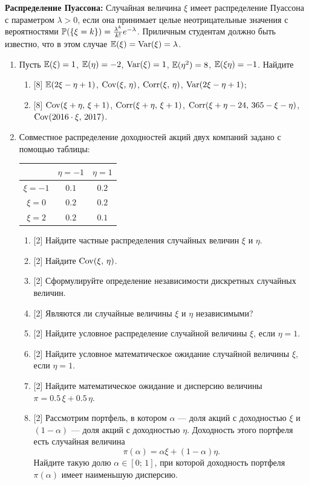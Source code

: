 \documentclass[12pt, a4paper]{article}\usepackage[]{graphicx}\usepackage[]{color}
\begin{document}
\textbf{Распределение Пуассона:} Случайная величина $\xi$ имеет распределение Пуассона с параметром $\lambda > 0$,  если она принимает целые неотрицательные значения с вероятностями $\P(\{\xi = k\}) = \frac{\lambda^k}{k!}e^{-\lambda}$. Приличным студентам должно быть известно, что в этом случае $\E(\xi) = \Var(\xi) = \lambda$.

\begin{enumerate}
\item Пусть $\E(\xi) = 1$, $\E(\eta) = -2$, $\Var(\xi) = 1$, $\E(\eta^2) = 8$, $\E(\xi \eta) = -1$. Найдите
\begin{enumerate}
  \item{} [8] $\E(2\xi-\eta+1)$, $\Cov(\xi, \,\eta)$, $\Corr(\xi, \,\eta)$,  $\Var(2\xi-\eta+1)$;
  \item{} [8] $\Cov(\xi+\eta, \,\xi+1)$, $\Corr(\xi+\eta, \,\xi+1)$, $\Corr(\xi+\eta-24, \,365 - \xi - \eta)$, $\Cov(2016\cdot\xi, \, 2017)$.
\end{enumerate}

\item
Совместное распределение доходностей акций двух компаний задано с помощью таблицы:

\begin{center}
\begin{tabular}{c|cc}
\toprule
         & $\eta=-1$ & $\eta=1$ \\
\midrule
$\xi=-1$  & $0.1$       & $0.2$   \\
$\xi=0$   & $0.2$       & $0.2$   \\
$\xi=2$   & $0.2$       & $0.1$   \\
\bottomrule
\end{tabular}
\end{center}

\begin{enumerate}
  \item{} [2] Найдите частные распределения случайных величин $\xi$ и $\eta$.
  \item{} [2] Найдите $\Cov(\xi,\,\eta)$.
  \item{} [2] Сформулируйте определение независимости дискретных случайных величин.
  \item{} [2] Являются ли случайные величины $\xi$ и $\eta$ независимыми?
  \item{} [2] Найдите условное распределение случайной величины $\xi$, если $\eta = 1$.
  \item{} [2] Найдите условное математическое ожидание случайной величины $\xi$, если $\eta = 1$.
  \item{} [2] Найдите математическое ожидание и дисперсию величины $\pi = 0.5\, \xi + 0.5\, \eta$.
  \item{} [2] Рассмотрим портфель, в котором $\alpha$ — доля акций с доходностью $\xi$ и $(1 - \alpha)$ — доля акций с доходностью $\eta$. Доходность этого портфеля есть случайная величина
  \[\pi(\alpha) = \alpha \xi + (1-\alpha)\eta.\]
  Найдите такую долю $\alpha \in [0;\,1]$, при которой доходность портфеля $\pi(\alpha)$ имеет наименьшую дисперсию.
\end{enumerate}


\end{enumerate}
\end{document}
